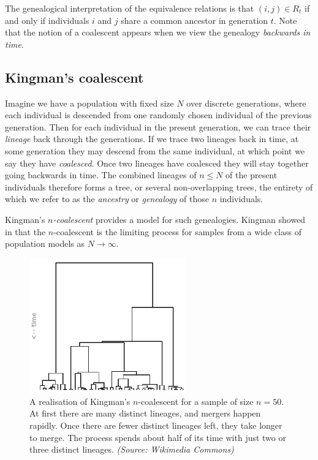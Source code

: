\documentclass[fleqn]{article}
\theoremstyle{definition}
\begin{document}
The genealogical interpretation of the equivalence relations is that $(i,j) \in R_t$ if and only if individuals $i$ and $j$ share a common ancestor in generation $t$.
Note that the notion of a coalescent appears when we view the genealogy \emph{backwards in time}.

\subsection{Kingman's coalescent}
Imagine we have a population with fixed size $N$ over discrete generations, where each individual is descended from one randomly chosen individual of the previous generation. Then for each individual in the present generation, we can trace their \emph{lineage} back through the generations. 
If we trace two lineages back in time, at some generation they may descend from the same individual, at which point we say they have \emph{coalesced}. Once two lineages have coalesced they will stay together going backwards in time.
The combined lineages of $n\leq N$ of the present individuals therefore forms a tree, or several non-overlapping trees, the entirety of which we refer to as the \emph{ancestry} or \emph{genealogy} of those $n$ individuals.

Kingman's \emph{$n$-coalescent} provides a model for such genealogies. Kingman showed in \citep{kingman1982gene, kingman1982coal, kingman1982exch} that  the $n$-coalescent is the limiting process for samples from a wide class of population models as $N\to\infty$.

\begin{figure}
\centering
\includegraphics[width=0.6\textwidth]{kingman.png}
\caption{A realisation of Kingman's $n$-coalescent for a sample of size $n=50$. At first there are many distinct lineages, and mergers happen rapidly. Once there are fewer distinct lineages left, they take longer to merge. The process spends about half of its time with just two or three distinct lineages. \textit{(Source: Wikimedia Commons)}}
\label{fig:kingman}
\end{figure}
\end{document}

